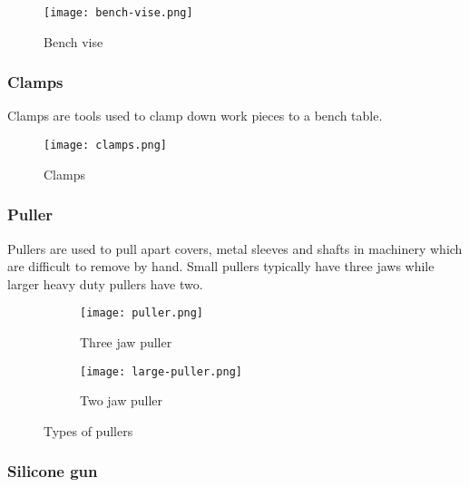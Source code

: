 \documentclass[a4paper,12pt]{article}
\begin{document}
						\begin{figure}[H]
							\centering				
							\texttt{[image: bench-vise.png]}
							\caption{Bench vise}
							\label{fig:bench-vise}
						\end{figure}
						
				\subsubsection*{Clamps}
				
					Clamps are tools used to clamp down work pieces to a bench table.
					 
						\begin{figure}[H]
							\centering				
							\texttt{[image: clamps.png]}
							\caption{Clamps}
							\label{fig:clamps}
						\end{figure}
				
				\newpage		
				\subsubsection*{Puller}
				
					Pullers are used to pull apart covers, metal sleeves and shafts in machinery which are difficult to remove by hand.
					Small pullers typically have three jaws while larger heavy duty pullers have two.
					
					\begin{figure}[H]
						\begin{subfigure}{0.5\textwidth}
							\centering				
							\texttt{[image: puller.png]}
							\caption{Three jaw puller}
							\label{subfig:three-jaw-puller}
						\end{subfigure}
						\hfill
						\begin{subfigure}{0.5\textwidth}
							\centering				
							\texttt{[image: large-puller.png]}
							\caption{Two jaw puller}
							\label{subfig:two-jaw-puller}
						\end{subfigure}
						\caption{Types of pullers}
						\label{fig:types-of-pullers}
					\end{figure}
					
				\subsubsection*{Silicone gun}
					
\end{document}
